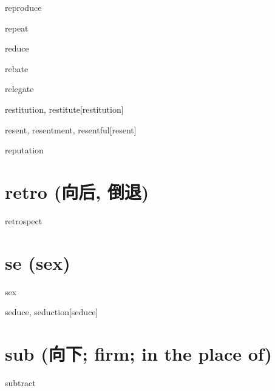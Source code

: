 \begin{RefWord}{reproduce}
\end{RefWord}

\begin{RefWord}{repeat}
\end{RefWord}

\begin{RefWord}{reduce}
\end{RefWord}

\begin{RefWord}{rebate}
\end{RefWord}

\begin{RefWord}{relegate}
\end{RefWord}

\begin{RefWord}{restitution, restitute}[restitution]
\end{RefWord}

\begin{RefWord}{resent, resentment, resentful}[resent]
\end{RefWord}

\begin{RefWord}{reputation}
\end{RefWord}

\section{retro (向后, 倒退)}
\begin{RefWord}{retrospect}
\end{RefWord}

\section{se (sex)}

\begin{RefWord}{sex}
\end{RefWord}

\begin{RefWord}{seduce, seduction}[seduce]
\end{RefWord}


\section{sub (向下; firm; in the place of)}

\begin{RefWord}{subtract}
\end{RefWord}

